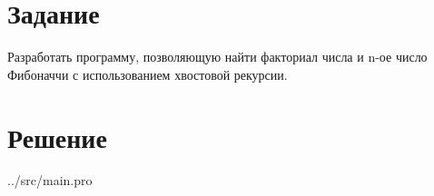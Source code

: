 \section*{Задание}

Разработать программу, позволяющую найти факториал числа и n-ое число Фибоначчи с использованием хвостовой рекурсии.
\clearpage

\section*{Решение}

\begin{lstinputlisting}[
	caption={Листинг программы},
	label={lst:t1},
	linerange={1-40},
	]{../src/main.pro}
\end{lstinputlisting}


